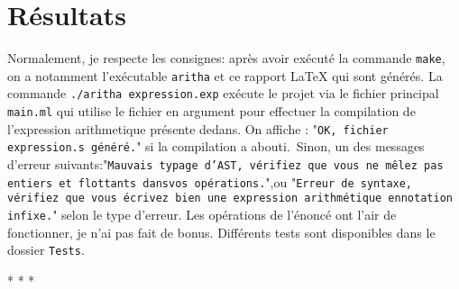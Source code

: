 \documentclass[12pt,french]{article}
\begin{document}
\section{Résultats}
Normalement, je respecte les consignes: après avoir exécuté la commande \texttt{make}, on a notamment l'exécutable \texttt{aritha} et ce rapport {\LaTeX}  qui sont générés. La commande \texttt{./aritha expression.exp} exécute le projet via le fichier principal \texttt{main.ml} qui utilise le fichier en argument pour effectuer la compilation de l'expression arithmetique présente dedans.\newline
On affiche : "\texttt{OK, fichier expression.s généré.}" si la compilation a abouti.\ Sinon, un des messages d'erreur suivants:\newline "\texttt{Mauvais typage d'AST, vérifiez que vous ne mêlez pas entiers et flottants dans\newline vos opérations.}",\newline ou \newline "\texttt{Erreur de syntaxe, vérifiez que vous écrivez bien une expression arithmétique en\newline notation infixe.}"\newline
selon le type d'erreur. \newline
Les opérations de l'énoncé ont l'air de fonctionner, je n'ai pas fait de bonus. Différents tests sont disponibles dans le dossier \texttt{Tests}.\newline
\newline
\begin{center}
    *  *  *
\end{center}
\end{document}

